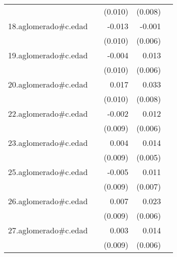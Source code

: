 {\begin{longtable}{l*{4}{D{.}{.}{-1}}}
            &                     &     (0.010)         &     (0.008)         &                     \\
\addlinespace
18.aglomerado#c.edad&                     &      -0.013         &      -0.001         &                     \\
            &                     &     (0.010)         &     (0.006)         &                     \\
\addlinespace
19.aglomerado#c.edad&                     &      -0.004         &       0.013\sym{*}  &                     \\
            &                     &     (0.010)         &     (0.006)         &                     \\
\addlinespace
20.aglomerado#c.edad&                     &       0.017         &       0.033\sym{***}&                     \\
            &                     &     (0.010)         &     (0.008)         &                     \\
\addlinespace
22.aglomerado#c.edad&                     &      -0.002         &       0.012\sym{*}  &                     \\
            &                     &     (0.009)         &     (0.006)         &                     \\
\addlinespace
23.aglomerado#c.edad&                     &       0.004         &       0.014\sym{*}  &                     \\
            &                     &     (0.009)         &     (0.005)         &                     \\
\addlinespace
25.aglomerado#c.edad&                     &      -0.005         &       0.011         &                     \\
            &                     &     (0.009)         &     (0.007)         &                     \\
\addlinespace
26.aglomerado#c.edad&                     &       0.007         &       0.023\sym{***}&                     \\
            &                     &     (0.009)         &     (0.006)         &                     \\
\addlinespace
27.aglomerado#c.edad&                     &       0.003         &       0.014\sym{*}  &                     \\
            &                     &     (0.009)         &     (0.006)         &                     \\

\end{longtable}}
